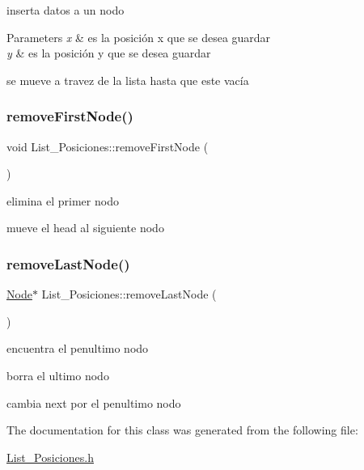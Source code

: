 inserta datos a un nodo 


\begin{DoxyParams}{Parameters}
{\em x} & es la posición x que se desea guardar \\
\hline
{\em y} & es la posición y que se desea guardar \\
\hline
\end{DoxyParams}
se mueve a travez de la lista hasta que este vacía\mbox{\label{classList__Posiciones_aa826398d2e34a0ccb1b4d0a91e06da30}} 
\subsubsection{\texorpdfstring{remove\+First\+Node()}{removeFirstNode()}}
{\footnotesize\ttfamily void List\+\_\+\+Posiciones\+::remove\+First\+Node (\begin{DoxyParamCaption}{ }\end{DoxyParamCaption})\hspace{0.3cm}{\ttfamily [inline]}}



elimina el primer nodo 

mueve el head al siguiente nodo\mbox{\label{classList__Posiciones_a44902a273edd12fa779341f7dbd0f4f1}} 
\subsubsection{\texorpdfstring{remove\+Last\+Node()}{removeLastNode()}}
{\footnotesize\ttfamily \hyperlink{classNode}{Node}$\ast$ List\+\_\+\+Posiciones\+::remove\+Last\+Node (\begin{DoxyParamCaption}{ }\end{DoxyParamCaption})\hspace{0.3cm}{\ttfamily [inline]}}

encuentra el penultimo nodo

borra el ultimo nodo

cambia next por el penultimo nodo

The documentation for this class was generated from the following file\+:\begin{DoxyCompactItemize}
\item 
\hyperlink{List__Posiciones_8h}{List\+\_\+\+Posiciones.\+h}\end{DoxyCompactItemize}
